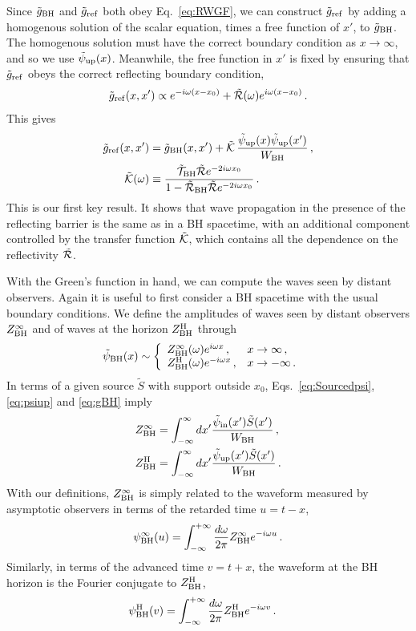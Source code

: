 \begin{refsection}
Since $\tilde g_{\rm BH}$ and $\tilde g_{\rm ref}$ both obey Eq.~\eqref{eq:RWGF}, we can construct $\tilde g_{\rm ref}$ by adding a homogenous solution of the scalar equation, times a free function of $x'$, to $\tilde g_{\rm BH}$.
The homogenous solution must have the correct boundary condition as $x \to \infty$, and so we use $\tilde \psi_{\rm up}(x)$.
Meanwhile, the free function in $x'$ is fixed by ensuring that $\tilde g_{\rm ref}$ obeys the correct reflecting boundary condition,
\begin{align}
\tilde g_{\rm ref}(x,x') \propto e^{-i\omega (x-x_0)}+\tilde{\mathcal R}(\omega) e^{i\omega (x-x_0)} \,.
\end{align}
This gives
\begin{align}
\label{eq:Gref}
\tilde g_{\rm ref}(x,x') & = \tilde g_{\rm BH}(x,x') + \tilde{\mathcal K} \, \frac{\tilde \psi_{\rm up}(x) \tilde \psi_{\rm up}(x')}{W_{\rm BH}} \,,\\
\label{eq:EchoTransfer}
\tilde{\mathcal K}(\omega) & \equiv \frac{\tilde{\mathcal T}_{\rm BH} \tilde{\mathcal R} e^{-2 i \omega x_0}}{1 - \tilde{\mathcal R}_{\rm BH} \tilde{\mathcal R} e^{-2 i \omega x_0}} \,.
\end{align}
This is our first key result.
It shows that wave propagation in the presence of the reflecting barrier is the same as in a BH spacetime, with an additional component controlled by the transfer function $\tilde{\mathcal K}$, which contains all the dependence on the reflectivity $\tilde{\mathcal R}$. 

With the Green's function in hand, we can compute the waves seen by distant observers.
Again it is useful to first consider a BH spacetime with the usual boundary conditions.
We define the amplitudes of waves seen by distant observers $Z^{\infty}_{\rm BH}$ and of waves at the horizon $Z^{\rm H}_{\rm BH}$ through
\begin{align}
\tilde \psi_{\rm BH}(x) & \sim 
\left \{
\begin{array}{ll}
Z^{\infty}_{\rm BH}(\omega) e^{i \omega x} \,, & x \to \infty \,, \\
Z^{\rm H}_{\rm BH}(\omega) e^{-i\omega x}\,, & x \to - \infty \,. \\
\end{array} \right. \label{eq:ZBHdef}
\end{align}
In terms of a given source $\tilde S$ with support outside $x_0$, Eqs.~\eqref{eq:Sourcedpsi}, \eqref{eq:psiup} and \eqref{eq:gBH} imply 
\begin{align}
Z^{\infty}_{\rm BH} & = \int_{-\infty}^\infty dx' \frac{\tilde \psi_{\rm in}(x') \tilde S(x')}{W_{\rm BH}} \,, \\
\label{eq:ZH}
Z^{\rm H}_{\rm BH} & = \int_{-\infty}^\infty dx' \frac{\tilde \psi_{\rm up}(x') \tilde S(x')}{W_{\rm BH}} \,.
\end{align}
With our definitions, $Z^{\infty}_{\rm BH}$ is simply related to the waveform measured by asymptotic observers in terms of the retarded time $u = t-x $,
\begin{align}
\psi^{\infty}_{\rm BH} (u) = \int_{-\infty}^{+\infty} \frac{d\omega}{2\pi} Z^{\infty}_{\rm BH} e^{-i\omega u} \,.
\end{align}
Similarly, in terms of the advanced time $v= t+x$, the waveform at the BH horizon is the Fourier conjugate to $Z^{\rm H}_{\rm BH}$,
\begin{align}
\psi^{\rm H}_{\rm BH}(v) & =  \int_{-\infty}^{+\infty} \frac{d\omega}{2\pi} Z^{\rm H}_{\rm BH} e^{-i\omega v} \,. \label{eq:ZFT}
\end{align}


\end{refsection}
